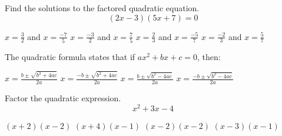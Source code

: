 \documentclass[12pt]{exam}
\begin{document}
\begin{questions}
\vfill


\newpage

\question Find the solutions to the factored quadratic equation.
$$(2x-3)(5x+7)=0$$
\begin{choices} 
	\correctchoice $x=\frac{3}{2}$ and $x=\frac{-7}{5}$
	\choice $x=\frac{-3}{2}$ and $x=\frac{7}{5}$
	\choice $x=\frac{2}{3}$ and $x=\frac{-5}{7}$
	\choice $x=\frac{-2}{3}$ and $x=\frac{5}{7}$
\end{choices}

\vfill

\question The quadratic formula states that if $ax^2+bx+c=0$, then:
\begin{choices} 
	\choice $x=\frac{b\pm\sqrt{b^2+4ac}}{2a}$
	\choice $x=\frac{-b\pm\sqrt{b^2+4ac}}{2a}$
	\choice $x=\frac{b\pm\sqrt{b^2-4ac}}{2a}$
	\correctchoice $x=\frac{-b\pm\sqrt{b^2-4ac}}{2a}$
\end{choices}

\vfill

\question Factor the quadratic expression. $$x^2+3x-4$$
\begin{choices} 
	\choice $(x+2)(x-2)$
	\correctchoice $(x+4)(x-1)$
	\choice $(x-2)(x-2)$
	\choice $(x-3)(x-1)$
\end{choices}

\vfill




\end{questions}
\end{document}
